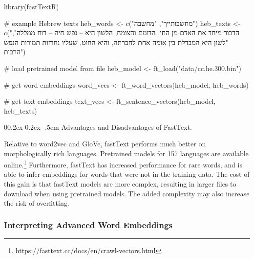 \documentclass[
  man,
  floatsintext,
  longtable,
  nolmodern,
  notxfonts,
  notimes,
  colorlinks=true,linkcolor=blue,citecolor=blue,urlcolor=blue]{apa7}
\makeatletter
\renewcommand{\paragraph}{\@startsection{paragraph}{4}{\parindent}%
	{0\baselineskip \@plus 0.2ex \@minus 0.2ex}%
	{-.5em}%
	{\normalfont\normalsize\bfseries\typesectitle}}
\newenvironment{Shaded}{\begin{snugshade}}{\end{snugshade}}
\newcommand{\CommentTok}[1]{\textcolor[rgb]{0.37,0.37,0.37}{#1}}
\newcommand{\FunctionTok}[1]{\textcolor[rgb]{0.28,0.35,0.67}{#1}}
\newcommand{\NormalTok}[1]{\textcolor[rgb]{0.00,0.23,0.31}{#1}}
\newcommand{\OtherTok}[1]{\textcolor[rgb]{0.00,0.23,0.31}{#1}}
\newcommand{\StringTok}[1]{\textcolor[rgb]{0.13,0.47,0.30}{#1}}
\makeatother
\begin{document}
\begin{Shaded}
\begin{Highlighting}[]
\FunctionTok{library}\NormalTok{(fastTextR)}

\CommentTok{\# example Hebrew texts}
\NormalTok{heb\_words }\OtherTok{\textless{}{-}} \FunctionTok{c}\NormalTok{(}\StringTok{"מחשבותייך"}\NormalTok{, }\StringTok{"מחשבה"}\NormalTok{)}
\NormalTok{heb\_texts }\OtherTok{\textless{}{-}} \FunctionTok{c}\NormalTok{(}\StringTok{"הדבור מיחד את האדם מן החי, הדומם והצומח, הלשון היא – נפש חיה – רוח ממללה"}\NormalTok{, }\StringTok{"לשון היא המבדלת בין אומה אחת לחברתה, והיא החוט, שעליו נחרזות תמורות הנפש הרבות"}\NormalTok{)}

\CommentTok{\# load pretrained model from file}
\NormalTok{heb\_model }\OtherTok{\textless{}{-}} \FunctionTok{ft\_load}\NormalTok{(}\StringTok{"data/cc.he.300.bin"}\NormalTok{)}

\CommentTok{\# get word embeddings}
\NormalTok{word\_vecs }\OtherTok{\textless{}{-}} \FunctionTok{ft\_word\_vectors}\NormalTok{(heb\_model, heb\_words)}

\CommentTok{\# get text embeddings}
\NormalTok{text\_vecs }\OtherTok{\textless{}{-}} \FunctionTok{ft\_sentence\_vectors}\NormalTok{(heb\_model, heb\_texts)}
\end{Highlighting}
\end{Shaded}

\paragraph{Advantages and Disadvantages of
FastText.}\label{advantages-and-disadvantages-of-fasttext}

Relative to word2vec and GloVe, fastText performs much better on
morphologically rich languages. Pretrained models for 157 languages are
available online.\footnote{https://fasttext.cc/docs/en/crawl-vectors.html}
Furthermore, fastText has increased performance for rare words, and is
able to infer embeddings for words that were not in the training data.
The cost of this gain is that fastText models are more complex,
resulting in larger files to download when using pretrained models. The
added complexity may also increase the risk of overfitting.

\subsubsection{Interpreting Advanced Word
Embeddings}\label{sec-embedding-magnitude}
\end{document}
